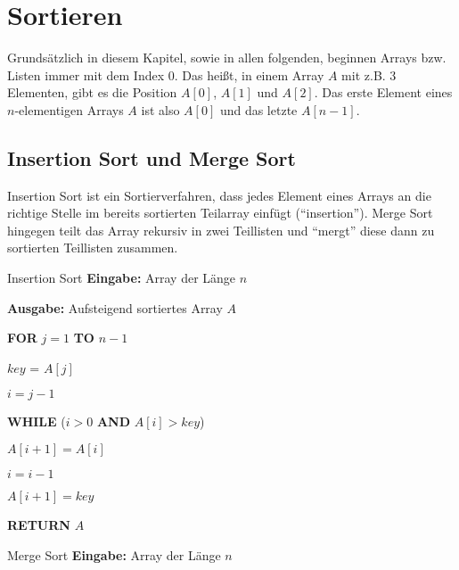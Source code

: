 \documentclass{panikzettel}
\newcommand\tab[1][1cm]{\hspace*{#1}}
\begin{document}
{\begin{halfboxr}
\begin{center}
	\end{center}
\end{halfboxr}

\section{Sortieren}

Grundsätzlich in diesem Kapitel, sowie in allen folgenden, beginnen Arrays bzw. Listen immer mit dem Index 0. Das heißt, in einem Array $A$ mit z.B. 3 Elementen, gibt es die Position $A[0]$, $A[1]$ und $A[2]$. Das erste Element eines $n$-elementigen Arrays $A$ ist also $A[0]$ und das letzte $A[n-1]$.

\subsection{Insertion Sort und Merge Sort}

Insertion Sort ist ein Sortierverfahren, dass jedes Element eines Arrays an die richtige Stelle im bereits sortierten Teilarray einfügt (``insertion''). Merge Sort hingegen teilt das Array rekursiv in zwei Teillisten und ``mergt'' diese dann zu sortierten Teillisten zusammen.

\begin{halfboxl}
	\vspace{-\baselineskip}
	\begin{algo}{Insertion Sort}
		\textbf{Eingabe:} Array der Länge $n$
		
		\textbf{Ausgabe:} Aufsteigend sortiertes Array $A$
		\tcblower
		
		\textbf{FOR} $j=1$ \textbf{TO} $n-1$
		
		\tab $key$ = $A[j]$
		
		\tab $i = j-1$
		
		\tab \textbf{WHILE} ($i>0$ \textbf{AND} $A[i]>key$)
		
		\tab\tab $A[i+1] = A[i]$
		
		\tab\tab $i =i-1$
		
		\tab $A[i+1] = key$
		
		\textbf{RETURN} $A$
	\end{algo}
\end{halfboxl}%
\begin{halfboxr}
	\vspace{-\baselineskip}
	\begin{algo}{Merge Sort}
		\textbf{Eingabe:} Array der Länge $n$
		

\end{algo}
\end{halfboxr}}
\end{document}

